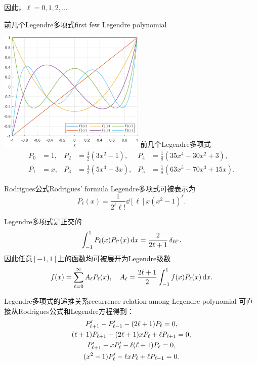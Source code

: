 因此，$\ell=0,1,2,\ldots$
\begin{example}{前几个Legendre多项式}{first few Legendre polynomial}
    \begin{center}
        \includegraphics[width=7cm]{graphs/Legendre.pdf}
        \tikzchap 前几个Legendre多项式
        \begin{align*}
            P_0&=1,&P_2&=\frac12(3x^2-1),&P_4&=\frac18(35x^4-30x^2+3),\\
            P_1&=x,&P_3&=\frac12(5x^3-3x),&P_5&=\frac18(63x^5-70x^3+15x).
        \end{align*}
    \end{center}
\end{example}
\begin{theorem}{Rodrigues公式}{Rodrigues' formula}
    Legendre多项式可被表示为
    \begin{equation}
        \label{eqn:Rodrigues}
        P_\ell(x)=\frac1{2^\ell\ell!}\dd[\ell]x(x^2-1)^\ell.
    \end{equation}
\end{theorem}
Legendre多项式是正交的
\[
    \int_{-1}^1P_\ell(x)P_{\ell'}(x)\mathop{}\!\mathrm{d} x=\frac2{2\ell+1}\mathop{}\!\delta_{\ell\ell'}.
\]
因此任意$[-1,1]$上的函数均可被展开为Legendre级数
\[
    f(x)=\sum_{\ell=0}^{\infty} A_\ell P_\ell(x),\quad A_\ell=\frac{2\ell+1}2\int_{-1}^1f(x)P_\ell(x)\mathop{}\!\mathrm{d} x.
\]
\begin{theorem}{Legendre多项式的递推关系}{recurrence relation among Legendre polynomial}
    可直接从Rodrigues公式和Legendre方程得到：
    \begin{gather}
        \label{eqn:Legendre 1 recurrence}
        P'_{\ell+1}-P'_{\ell-1}-(2\ell+1)P_\ell=0,\\
        (\ell+1)P_{\ell+1}-(2\ell+1)xP_\ell+\ell P_{\ell+1}=0,\\
        \notag
        P'_{\ell+1}-xP'_\ell-\ell(\ell+1)P_\ell=0,\\
        \notag
        (x^2-1)P'_\ell-\ell xP_\ell+\ell P_{\ell-1}=0.
    \end{gather}
\end{theorem}
